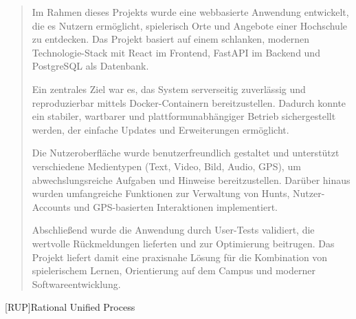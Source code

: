\documentclass[oneside]{ausarbeitung}
\begin{document}
\begin{abstract}

Im Rahmen dieses Projekts wurde eine webbasierte Anwendung entwickelt, die es Nutzern ermöglicht, spielerisch Orte und Angebote einer Hochschule zu entdecken.  
Das Projekt basiert auf einem schlanken, modernen Technologie-Stack mit React im Frontend, FastAPI im Backend und PostgreSQL als Datenbank.  

Ein zentrales Ziel war es, das System serverseitig zuverlässig und reproduzierbar mittels Docker-Containern bereitzustellen.  
Dadurch konnte ein stabiler, wartbarer und plattformunabhängiger Betrieb sichergestellt werden, der einfache Updates und Erweiterungen ermöglicht.  

Die Nutzeroberfläche wurde benutzerfreundlich gestaltet und unterstützt verschiedene Medientypen (Text, Video, Bild, Audio, GPS), um abwechslungsreiche Aufgaben und Hinweise bereitzustellen.  
Darüber hinaus wurden umfangreiche Funktionen zur Verwaltung von Hunts, Nutzer-Accounts und GPS-basierten Interaktionen implementiert.  

Abschließend wurde die Anwendung durch User-Tests validiert, die wertvolle Rückmeldungen lieferten und zur Optimierung beitrugen.  
Das Projekt liefert damit eine praxisnahe Lösung für die Kombination von spielerischem Lernen, Orientierung auf dem Campus und moderner Softwareentwicklung.

\end{abstract}
\cleardoublepage
\tableofcontents

\listoffigures

\listoftables


\begin{acronym}[Bsp.]  %

[RUP]{Rational Unified Process}
\end{acronym}


\cleardoublepage
{}
\setcounter{page}{1}

\end{document}
